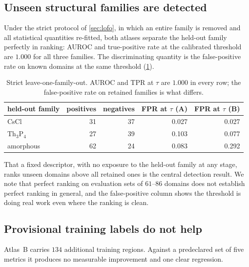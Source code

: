 \subsection{Unseen structural families are detected}
\label{sec:res-lofo}

Under the strict protocol of \cref{sec:lofo}, in which an entire family is removed and all
statistical quantities re-fitted, both atlases separate the held-out family perfectly in
ranking: AUROC and true-positive rate at the calibrated threshold are $1.000$ for all three
families. The discriminating quantity is the false-positive rate on known domains at the
same threshold (\cref{tab:lofo}).

\begin{table}[htbp]
  \centering\small
  \caption{Strict leave-one-family-out. AUROC and TPR at $\tau$ are $1.000$ in every row;
  the false-positive rate on retained families is what differs.}
  \label{tab:lofo}
  \begin{tabular}{lrrrr}
    \toprule
    held-out family & positives & negatives & FPR at $\tau$ (A) & FPR at $\tau$ (B) \\
    \midrule
    CsCl        & 31 & 37 & 0.027 & 0.027 \\
    Th$_3$P$_4$ & 27 & 39 & 0.103 & 0.077 \\
    amorphous   & 62 & 24 & 0.083 & 0.292 \\
    \bottomrule
  \end{tabular}
\end{table}

That a fixed descriptor, with no exposure to the held-out family at any stage, ranks unseen
domains above all retained ones is the central detection result. We note that perfect
ranking on evaluation sets of $61$--$86$ domains does not establish perfect ranking in
general, and the false-positive column shows the threshold is doing real work even where the
ranking is clean.

\subsection{Provisional training labels do not help}
\label{sec:res-ab}

Atlas~B carries $134$ additional training regions. Against a predeclared set of five
metrics it produces no measurable improvement and one clear regression.

